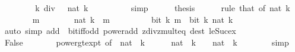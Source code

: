 \begin{isabellebody}
\ \ \ \ \isamarkupfalse%
\ \isamarkupfalse%
\ {\isacharasterisk}{\kern0pt}{\isacharcolon}{\kern0pt}\ {\isacartoucheopen}k\ div\ {}\ {\isacharcircum}{\kern0pt}\ nat\ k\ {\isacharequal}{\kern0pt}\ {}{\isacartoucheclose}\isanewline
\ \ \ \ \ \ \isamarkupfalse%
\ simp\isanewline
\ \ \ \ \isamarkupfalse%
\ thesis\isanewline
\ \ \ \ \isamarkupfalse%
\ {\isacharparenleft}{\kern0pt}rule\ that\ {\isacharbrackleft}{\kern0pt}of\ {\isacartoucheopen}nat\ k{\isacartoucheclose}{\isacharbrackright}{\kern0pt}{\isacharparenright}{\kern0pt}\isanewline
\ \ \ \ \ \ \isamarkupfalse%
\ m\isanewline
\ \ \ \ \ \ \isamarkupfalse%
\ {\isacartoucheopen}nat\ k\ {\isasymle}\ m{\isacartoucheclose}\isanewline
\ \ \ \ \ \ \isamarkupfalse%
\ \isamarkupfalse%
\ {\isacartoucheopen}bit\ k\ m\ {\isasymlongleftrightarrow}\ bit\ k\ {\isacharparenleft}{\kern0pt}nat\ k{\isacharparenright}{\kern0pt}{\isacartoucheclose}\isanewline
\ \ \ \ \ \ \ \ \isamarkupfalse%
\ {\isacharparenleft}{\kern0pt}auto\ simp\ add{\isacharcolon}{\kern0pt}\ {\isacharasterisk}{\kern0pt}\ bit{\isacharunderscore}{\kern0pt}iff{\isacharunderscore}{\kern0pt}odd\ power{\isacharunderscore}{\kern0pt}add\ zdiv{\isacharunderscore}{\kern0pt}zmult{}{\isacharunderscore}{\kern0pt}eq\ dest{\isacharbang}{\kern0pt}{\isacharcolon}{\kern0pt}\ le{\isacharunderscore}{\kern0pt}Suc{\isacharunderscore}{\kern0pt}ex{\isacharparenright}{\kern0pt}\isanewline
\ \ \ \ \isamarkupfalse%
\isanewline
\ \ \isamarkupfalse%
\isanewline
\ \ \ \ \isamarkupfalse%
\ False\isanewline
\ \ \ \ \isamarkupfalse%
\ \isamarkupfalse%
\ power{\isacharunderscore}{\kern0pt}gt{\isacharunderscore}{\kern0pt}expt\ {\isacharbrackleft}{\kern0pt}of\ {}\ {\isacartoucheopen}nat\ {\isacharparenleft}{\kern0pt}{\isacharminus}{\kern0pt}\ k{\isacharparenright}{\kern0pt}{\isacartoucheclose}{\isacharbrackright}{\kern0pt}\isanewline
\ \ \ \ \isamarkupfalse%
\ {\isacartoucheopen}nat\ {\isacharparenleft}{\kern0pt}{\isacharminus}{\kern0pt}\ k{\isacharparenright}{\kern0pt}\ {\isacharless}{\kern0pt}\ {}\ {\isacharcircum}{\kern0pt}\ nat\ {\isacharparenleft}{\kern0pt}{\isacharminus}{\kern0pt}\ k{\isacharparenright}{\kern0pt}{\isacartoucheclose}\isanewline
\ \ \ \ \ \ \isamarkupfalse%
\ simp\isanewline
\ \ \ \ \isamarkupfalse%
\ \isamarkupfalse%

\end{isabellebody}
